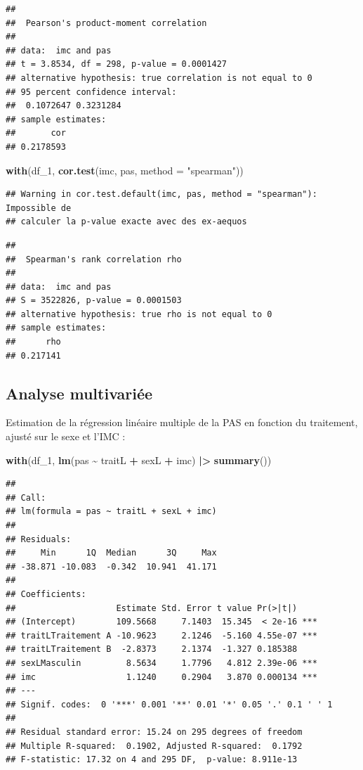 \documentclass[
]{book}
\newenvironment{Shaded}{\begin{snugshade}}{\end{snugshade}}
\newcommand{\AttributeTok}[1]{\textcolor[rgb]{0.13,0.29,0.53}{#1}}
\newcommand{\FunctionTok}[1]{\textcolor[rgb]{0.13,0.29,0.53}{\textbf{#1}}}
\newcommand{\NormalTok}[1]{#1}
\newcommand{\SpecialCharTok}[1]{\textcolor[rgb]{0.81,0.36,0.00}{\textbf{#1}}}
\newcommand{\StringTok}[1]{\textcolor[rgb]{0.31,0.60,0.02}{#1}}
\begin{document}
\begin{verbatim}
## 
##  Pearson's product-moment correlation
## 
## data:  imc and pas
## t = 3.8534, df = 298, p-value = 0.0001427
## alternative hypothesis: true correlation is not equal to 0
## 95 percent confidence interval:
##  0.1072647 0.3231284
## sample estimates:
##       cor 
## 0.2178593
\end{verbatim}

\begin{Shaded}
\begin{Highlighting}[]
\FunctionTok{with}\NormalTok{(df\_1,}
     \FunctionTok{cor.test}\NormalTok{(imc, pas, }\AttributeTok{method =} \StringTok{"spearman"}\NormalTok{))}
\end{Highlighting}
\end{Shaded}

\begin{verbatim}
## Warning in cor.test.default(imc, pas, method = "spearman"): Impossible de
## calculer la p-value exacte avec des ex-aequos
\end{verbatim}

\begin{verbatim}
## 
##  Spearman's rank correlation rho
## 
## data:  imc and pas
## S = 3522826, p-value = 0.0001503
## alternative hypothesis: true rho is not equal to 0
## sample estimates:
##      rho 
## 0.217141
\end{verbatim}

\subsection{Analyse multivariée}\label{analyse-multivariuxe9e-1}

Estimation de la régression linéaire multiple de la PAS en fonction du traitement, ajusté sur le sexe et l'IMC :

\begin{Shaded}
\begin{Highlighting}[]
\FunctionTok{with}\NormalTok{(df\_1,}
     \FunctionTok{lm}\NormalTok{(pas }\SpecialCharTok{\textasciitilde{}}\NormalTok{ traitL }\SpecialCharTok{+}\NormalTok{ sexL }\SpecialCharTok{+}\NormalTok{ imc) }\SpecialCharTok{|\textgreater{}}
       \FunctionTok{summary}\NormalTok{())}
\end{Highlighting}
\end{Shaded}

\begin{verbatim}
## 
## Call:
## lm(formula = pas ~ traitL + sexL + imc)
## 
## Residuals:
##     Min      1Q  Median      3Q     Max 
## -38.871 -10.083  -0.342  10.941  41.171 
## 
## Coefficients:
##                    Estimate Std. Error t value Pr(>|t|)    
## (Intercept)        109.5668     7.1403  15.345  < 2e-16 ***
## traitLTraitement A -10.9623     2.1246  -5.160 4.55e-07 ***
## traitLTraitement B  -2.8373     2.1374  -1.327 0.185388    
## sexLMasculin         8.5634     1.7796   4.812 2.39e-06 ***
## imc                  1.1240     0.2904   3.870 0.000134 ***
## ---
## Signif. codes:  0 '***' 0.001 '**' 0.01 '*' 0.05 '.' 0.1 ' ' 1
## 
## Residual standard error: 15.24 on 295 degrees of freedom
## Multiple R-squared:  0.1902, Adjusted R-squared:  0.1792 
## F-statistic: 17.32 on 4 and 295 DF,  p-value: 8.911e-13
\end{verbatim}
\end{document}
